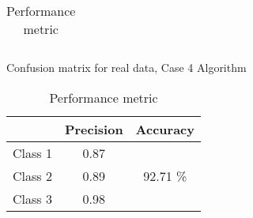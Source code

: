 \documentclass[11pt,paper=a4,answers]{exam}
\begin{document}
\begin{questions}
\begin{enumerate}[i.]
\begin{enumerate}
\begin{table}[ht]
\begin{tabular}{c | c c c c | c | c |}
                    \end{tabular}
                    \caption{Confusion matrix for real data, Case 4 Algorithm}
                    \label{tab:rdcon4}
                \endminipage\hfill
                    \begin{tabular}{| l | c | c |}
                        \hline
                        & Precision & Accuracy\\
                        \hline
                        Class 1 & 0.87 & \\
                        \cline{1-2}
                        Class 2 & 0.89 & 92.71 \%\\
                        \cline{1-2}
                        Class 3 & 0.98 & \\
                        \hline
                    \end{tabular}
                    \caption{Performance metric}
                \endminipage\hfill
            \end{table}\\


\end{enumerate}
\end{enumerate}
\end{questions}
\end{document}
